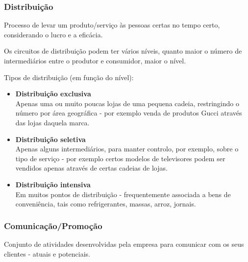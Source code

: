\documentclass[11pt]{article}
\begin{document}
\subsubsection{Distribuição}

Processo de levar um produto/serviço às pessoas certas no tempo certo, considerando o lucro e a eficácia.

Os circuitos de distribuição podem ter vários níveis, quanto maior o número de intermediários entre o produtor e consumidor, maior o nível.

Tipos de distribuição (em função do nível):
\begin{itemize}[topsep=0pt]
    \item \textbf{Distribuição exclusiva} \\
          Apenas uma ou muito poucas lojas de uma pequena cadeia, restringindo o número por área geográfica - por exemplo venda de produtos Gucci através das lojas daquela marca.
    \item \textbf{Distribuição seletiva} \\
          Apenas alguns intermediários, para manter controlo, por exemplo, sobre o tipo de serviço - por exemplo certos modelos de televisores podem ser vendidos apenas através de certas cadeias de lojas.
    \item \textbf{Distribuição intensiva} \\
          Em muitos pontos de distribuição - frequentemente associada a bens de conveniência, tais como refrigerantes, massas, arroz, jornais.
\end{itemize}

\subsubsection{Comunicação/Promoção}

Conjunto de atividades desenvolvidas pela empresa para comunicar com os seus clientes - atuais e potenciais.
\end{document}
